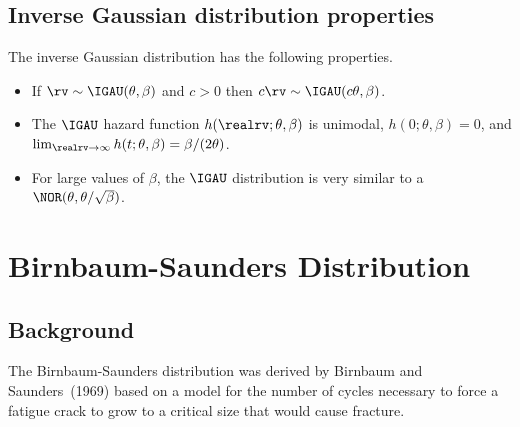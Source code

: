 \subsection{Inverse Gaussian distribution properties}
The inverse Gaussian distribution has the following properties.
 \begin{itemize}
\item 
If $\rv \sim \IGAU(\theta, \beta)$ and $c>0$ then $c \rv \sim
\IGAU(c\theta, \beta)$.
\item 
The $\IGAU$ hazard function $h(\realrv;\theta,\beta)$ is unimodal,
$h(0;\theta,\beta)=0$, and $\lim_{\realrv \to
\infty}h(t;\theta,\beta)=\beta/(2 \theta)$.
\item 
For large values of $\beta$, the $\IGAU$ distribution is very similar
to a $\NOR( \theta, \theta/\sqrt{\beta})$.
 \end{itemize}

\section{Birnbaum-Saunders Distribution}
\label{section:bisa.dist}
\subsection{Background}
The Birnbaum-Saunders distribution was derived by Birnbaum and
Saunders~(1969) based on a model for the number of cycles necessary
to force a fatigue crack to grow to a critical size that would cause
fracture.

